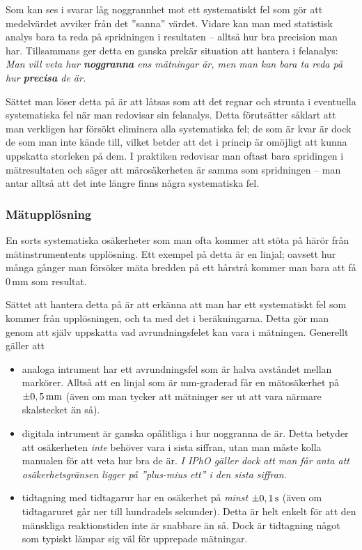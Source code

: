 \documentclass[11pt,a4paper, swedish
]{article}
\newcounter{exempel_counter}%
\begin{document}
Som kan ses i  svarar låg noggrannhet mot ett
systematiskt fel som gör att medelvärdet avviker från det ''sanna''
värdet. Vidare kan man med statistisk analys bara ta reda på
spridningen i resultaten -- alltså hur bra precision man
har. Tillsammans ger detta en ganska prekär situation att hantera i
felanalys: 
\emph{Man vill veta hur {\bf noggranna} ens mätningar är, men man kan bara
  ta reda på hur {\bf precisa} de är.} 

Sättet man löser detta på är att låtsas som att det regnar och strunta
i eventuella systematiska fel när man redovisar sin felanalys. Detta
förutsätter såklart att man verkligen har försökt eliminera alla
systematiska fel; de som är kvar är dock de som man inte kände till,
vilket betder att det i princip är omöjligt att kunna uppskatta
storleken på dem. I praktiken redovisar man oftast bara spridingen i
mätresultaten och säger att märosäkerheten är samma som spridningen --
man antar alltså att det inte längre finns några systematiska fel. 

\subsubsection{Mätupplösning}
En sorts systematiska\footnotemark{} osäkerheter som man ofta kommer
att stöta på härör från mätinstrumentents upplösning. Ett exempel på
detta är en linjal; oavsett hur många gånger man försöker mäta bredden
på ett hårstrå kommer man bara att få 0\,mm som resultat. 

Sättet att hantera detta på är att erkänna att man har ett
systematiskt fel som kommer från upplösningen, och ta med det i
beräkningarna. Detta gör man genom att själv uppskatta vad
avrundningsfelet kan vara i mätningen. Generellt gäller att
\begin{itemize}
\item analoga intrument har ett avrundningsfel som är halva
  avståndet mellan markörer. Alltså att en linjal som är mm-graderad
  får en mätosäkerhet på $\pm\unit[0,5]{mm}$ (även om man tycker att
  mätninger ser ut att vara närmare skalstecket än så).
\item digitala intrument är ganska opålitliga i hur noggranna de
  är. Detta betyder att osäkerheten \emph{inte} behöver vara i sista
  siffran, utan man måste kolla manualen för att veta hur bra de är. 
  \emph{I IPhO gäller dock att man får anta att osäkerhetsgränsen
    ligger på ''plus-mius ett'' i den sista siffran.} 
\item tidtagning med tidtagarur har en osäkerhet på \emph{minst}
  $\pm\unit[0,1]{s}$ (även om tidtagaruret går ner till hundradels
  sekunder). Detta är helt enkelt för att den mänskliga reaktionstiden
  inte är snabbare än så. Dock är tidtagning något som typiskt lämpar
  sig väl för upprepade mätningar.
\end{itemize}
\end{document}
